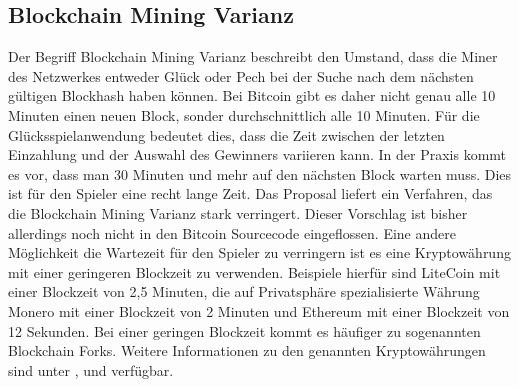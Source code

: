 \subsection{Blockchain Mining Varianz}
Der Begriff Blockchain Mining Varianz beschreibt den Umstand, dass die Miner des Netzwerkes entweder Glück oder Pech bei der Suche nach dem nächsten gültigen Blockhash haben können. Bei Bitcoin gibt es daher nicht genau alle 10 Minuten einen neuen Block, sonder durchschnittlich alle 10 Minuten. Für die Glücksspielanwendung bedeutet dies, dass die Zeit zwischen der letzten Einzahlung und der Auswahl des Gewinners variieren kann. In der Praxis kommt es vor, dass man 30 Minuten und mehr auf den nächsten Block warten muss. Dies ist für den Spieler eine recht lange Zeit. Das Proposal \cite{bobtail} liefert ein Verfahren, das die Blockchain Mining Varianz stark verringert. Dieser Vorschlag ist bisher allerdings noch nicht in den Bitcoin Sourcecode eingeflossen.
Eine andere Möglichkeit die Wartezeit für den Spieler zu verringern ist es eine  Kryptowährung mit einer geringeren Blockzeit zu verwenden. Beispiele hierfür sind LiteCoin mit einer Blockzeit von 2,5 Minuten, die auf Privatsphäre spezialisierte Währung Monero mit einer Blockzeit von 2 Minuten und Ethereum mit einer Blockzeit von 12 Sekunden. Bei einer geringen Blockzeit kommt es häufiger zu sogenannten Blockchain Forks. Weitere Informationen zu den genannten Kryptowährungen sind unter \cite{coin_ltc}, \cite{coin_xmr} und \cite{coin_eth} verfügbar.

